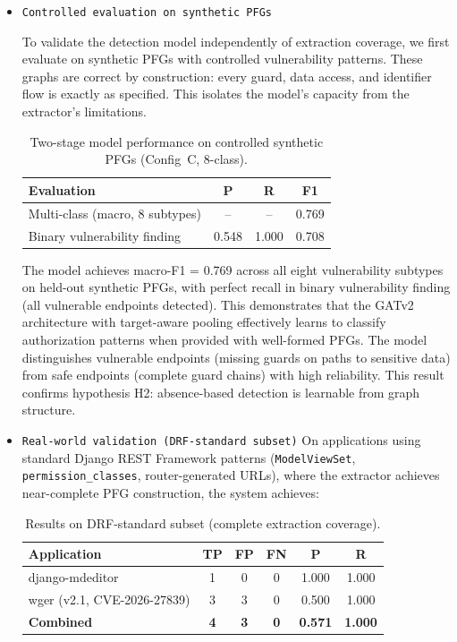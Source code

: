 \begin{itemize}

\item  \texttt{Controlled evaluation on synthetic PFGs}

To validate the detection model independently of extraction coverage, we
first evaluate on synthetic PFGs with controlled vulnerability patterns.
These graphs are correct by construction: every guard, data access, and
identifier flow is exactly as specified. This isolates the model's capacity
from the extractor's limitations.

\begin{table}[htbp]
\centering
\caption{Two-stage model performance on controlled synthetic PFGs (Config~C, 8-class).}
\label{tab:det-controlled}
\begin{tabular}{@{}lccc@{}}
\toprule
\textbf{Evaluation} & \textbf{P} & \textbf{R} & \textbf{F1} \\
\midrule
Multi-class (macro, 8 subtypes) & -- & -- & 0.769 \\
Binary vulnerability finding & 0.548 & 1.000 & 0.708 \\
\bottomrule
\end{tabular}
\end{table}

The model achieves macro-F1 = 0.769 across all eight vulnerability subtypes
on held-out synthetic PFGs, with perfect recall in binary vulnerability
finding (all vulnerable endpoints detected). This demonstrates that the
GATv2 architecture with target-aware pooling effectively learns to classify
authorization patterns when provided with well-formed PFGs. The model
distinguishes vulnerable endpoints (missing guards on paths to sensitive
data) from safe endpoints (complete guard chains) with high reliability.
This result confirms hypothesis H2: absence-based detection is learnable
from graph structure.

\item  \texttt{Real-world validation (DRF-standard subset)}
On applications using standard Django REST Framework patterns
(\texttt{ModelViewSet}, \texttt{permission\_classes}, router-generated URLs),
where the extractor achieves near-complete PFG construction, the system
achieves:

\begin{table}[htbp]
\centering
\caption{Results on DRF-standard subset (complete extraction coverage).}
\label{tab:det-drf}
\begin{tabular}{@{}lccccc@{}}
\toprule
\textbf{Application} & \textbf{TP} & \textbf{FP} & \textbf{FN}
& \textbf{P} & \textbf{R} \\
\midrule
django-mdeditor & 1 & 0 & 0 & 1.000 & 1.000 \\
wger (v2.1, CVE-2026-27839) & 3 & 3 & 0 & 0.500 & 1.000 \\
\midrule
\textbf{Combined} & \textbf{4} & \textbf{3} & \textbf{0}
& \textbf{0.571} & \textbf{1.000} \\
\bottomrule
\end{tabular}
\end{table}


\end{itemize}
